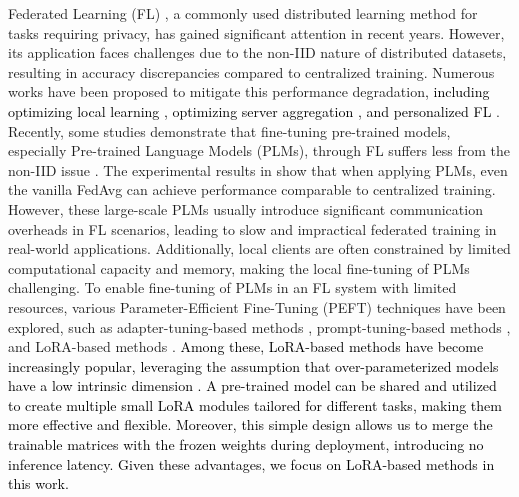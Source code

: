 \documentclass{article} %
\newcommand{\pengxin}[1]{\textcolor{black}{#1}}
\begin{document}
Federated Learning (FL) \citep{mcmahan2017communication,li2020bfederated,zhang2021survey,kairouz2021advances}, a commonly used distributed learning method for tasks requiring privacy, has gained significant attention in recent years. However, its application faces challenges due to the non-IID nature of distributed datasets, resulting in accuracy discrepancies compared to centralized training. 
Numerous works \citep{li2020federated,xu2023personalized,yan2023label,chaninternal,xu2024fedconv,zeng2024tackling} have been proposed to mitigate this performance degradation\pengxin{, including optimizing local learning \citep{li2020federated}, optimizing server aggregation \citep{zeng2024tackling}, and personalized FL \citep{xu2023personalized}}.
Recently, some studies demonstrate that fine-tuning pre-trained models, especially Pre-trained Language Models (PLMs), through FL suffers less from the non-IID issue \citep{qu2022rethinking,chenimportance,nguyenbegin,weller2022pretrained}. 
The experimental results in  \citep{weller2022pretrained} show that when applying PLMs, even the vanilla FedAvg can achieve performance comparable to centralized training. 
However, these large-scale PLMs usually introduce significant communication overheads in FL scenarios, leading to slow and impractical federated training in real-world applications. Additionally, local clients are often constrained by limited computational capacity and memory, making the local fine-tuning of PLMs challenging. 
To enable fine-tuning of PLMs in an FL system with limited resources, various Parameter-Efficient Fine-Tuning (PEFT) techniques have been explored, such as adapter-tuning-based methods \citep{houlsby2019parameter,zhang2024enhancing}, prompt-tuning-based methods \citep{li2021prefix,guo2023promptfl,che2023federated,guo2023pfedprompt,qiu2024federated,li2024global,deng2024unlocking,sun2024fedbpt,cui2024harmonizing,cao2024sfprompt}, and LoRA-based methods \citep{hulora,yi2023fedlora,liu2023differentially,yang2024dual,qi2024fdlora,cho2023heterogeneous,byun2024towards,chen2024rbla,sunimproving,lin2024splitlora,wu2024fedbiot,wang2024flora}. 
\pengxin{Among these, LoRA-based methods have become increasingly popular, leveraging the assumption that over-parameterized models have a low intrinsic dimension \citep{li2018measuring,aghajanyan2020intrinsic}. A pre-trained model can be shared and utilized to create multiple small LoRA modules tailored for different tasks, making them more effective and flexible. Moreover, this simple design allows us to merge the trainable matrices with the frozen weights during deployment, introducing no inference latency. Given these advantages, we focus on LoRA-based methods in this work.}
\end{document}
